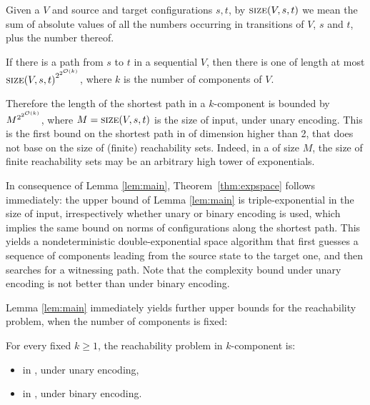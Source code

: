 Given a \vass $V$ and source and target configurations $s, t$, by
$\textsc{size}(V,s,t)$ we mean the sum of absolute values of all the numbers occurring in transitions of $V$, $s$ and $t$, 
plus the number thereof.

\begin{lemma}\label{lem:main}
If there is a path from $s$ to $t$ in a sequential \tvass $V$,
then there is one of length at most 
${\textsc{size}(V,s,t)}^{2^{2^{{\cal O}(k)}}}$, where $k$ is the number of components of $V$.
\end{lemma}


\noindent
Therefore the length of the shortest path in a $k$-component \tvass is bounded by ${M}^{2^{2^{{\cal O}(k)}}}$,
where $M = \textsc{size}(V,s,t)$ is the size of input, under unary encoding.
This is the first bound on the shortest path in \vass of dimension higher than 2, that does not base on
the size of (finite) reachability sets.
Indeed, in a \tvass of size $M$, the size of finite reachability sets may be an arbitrary high tower of exponentials.

In consequence of Lemma \ref{lem:main}, 
Theorem~\ref{thm:expspace} follows immediately: 
the upper bound of Lemma \ref{lem:main} 
is triple-exponential in the size of input, irrespectively whether unary or  binary encoding is used, 
which implies the same bound on norms of configurations
along the shortest path.
This yields a nondeterministic double-exponential space algorithm that
first guesses a sequence of components leading from the source state to the target one,
and then searches for a witnessing path.
Note that the complexity bound under unary encoding is not better than under binary encoding. 



Lemma \ref{lem:main} immediately yields further upper bounds for the reachability problem,
when the number of components is fixed:

\begin{corollary}\label{cor:fixed-components}
For every fixed $k \geq 1$, the reachability problem in $k$-component \tvass is:
\begin{itemize}
  \item in \nl, under unary encoding,
  \item in \pspace, under binary encoding.
\end{itemize}
\end{corollary}

